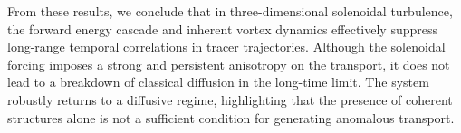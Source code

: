 \documentclass[]{article}
\begin{document}
From these results, we conclude that in three-dimensional solenoidal turbulence, the forward energy cascade and inherent vortex dynamics effectively suppress long-range temporal correlations in tracer trajectories. Although the solenoidal forcing imposes a strong and persistent anisotropy on the transport, it does not lead to a breakdown of classical diffusion in the long-time limit. The system robustly returns to a diffusive regime, highlighting that the presence of coherent structures alone is not a sufficient condition for generating anomalous transport.


{}

\end{document}
